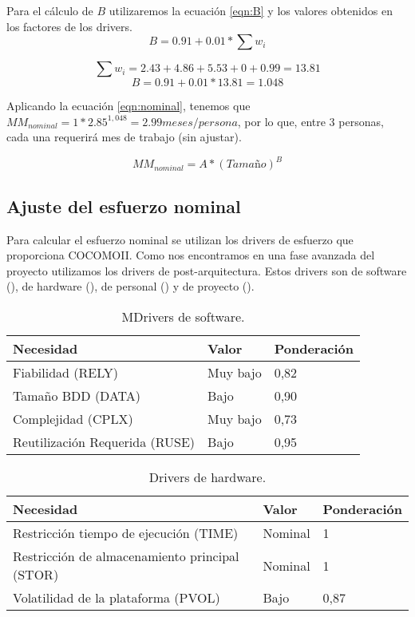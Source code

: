 \par Para el cálculo de $B$ utilizaremos la ecuación \ref{eqn:B} y los valores obtenidos en los factores de los drivers.
\begin{equation} \label{eqn:B}B = 0.91 + 0.01 *\sum w_{i}\end{equation}

$$\sum w_{i}=2.43+4.86+5.53+0+0.99=13.81$$
$$B = 0.91 + 0.01*13.81=1.048$$

\par Aplicando la ecuación \ref{eqn:nominal}, tenemos que $MM_{nominal}=1*2.85^{1,048}=2.99meses/persona$, por lo que, entre 3 personas, cada una requerirá  mes de trabajo (sin ajustar).

\begin{equation} \label{eqn:nominal}MM_{nominal}=A*(Tamaño)^B\end{equation}



\subsection{Ajuste del esfuerzo nominal}
Para calcular el esfuerzo nominal se utilizan los drivers de esfuerzo que proporciona COCOMOII. Como nos encontramos en una fase avanzada del proyecto utilizamos los drivers de  post-arquitectura. Estos drivers son de software (\label{tab:software}), de hardware (\label{tab:hardware}), de personal (\label{tab:personal}) y de proyecto (\label{tab:proyecto}).

\begin{table}[h]
\begin{center}
\begin{tabular}{ l l l }
\textbf{Necesidad} & \textbf{Valor} & \textbf{Ponderación} \\ \hline
Fiabilidad (RELY) &
Muy bajo &
0,82 \\
Tamaño BDD (DATA) &
Bajo &
0,90 \\
Complejidad (CPLX) &
Muy bajo &
0,73 \\
Reutilización Requerida (RUSE) &
Bajo &
0,95 \\ \hline
\end{tabular}
\caption{MDrivers de software.}
\label{tab:software}
\end{center}
\end{table}

\begin{table}[h]
\begin{center}
\begin{tabular}{ l l l }
\textbf{Necesidad} & \textbf{Valor} & \textbf{Ponderación} \\ \hline
Restricción tiempo de ejecución (TIME) &
Nominal &
1 \\
Restricción de almacenamiento principal (STOR) &
Nominal &
1 \\
Volatilidad de la plataforma (PVOL) &
Bajo &
0,87 \\ \hline
\end{tabular}
\caption{Drivers de hardware.}
\label{tab:hardware}
\end{center}
\end{table}

